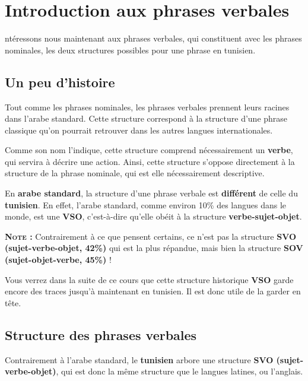 \chapter{Introduction aux phrases verbales}
ntéressons nous maintenant aux phrases verbales, qui constituent avec les phrases nominales, les deux structures possibles pour une phrase en tunisien.

\section{Un peu d'histoire}
Tout comme les phrases nominales, les phrases verbales prennent leurs racines dans l'arabe standard. Cette structure correspond à la structure d'une phrase classique qu'on pourrait retrouver dans les autres langues internationales.

Comme son nom l'indique, cette structure comprend nécessairement un \textbf{verbe}, qui servira à décrire une action. Ainsi, cette structure s'oppose directement à la structure de la phrase nominale, qui est elle nécessairement descriptive.

En \textbf{arabe standard}, la structure d'une phrase verbale est \textbf{différent} de celle du \textbf{tunisien}. En effet, l'arabe standard, comme environ 10\% des langues dans le monde, est une \textbf{VSO}, c'est-à-dire qu'elle obéit à la structure \textbf{verbe-sujet-objet}.

\textbf{\textsc{Note} :} Contrairement à ce que pensent certains, ce n'est pas la structure \textbf{SVO (sujet-verbe-objet, 42\%)} qui est la plus répandue, mais bien la structure \textbf{SOV (sujet-objet-verbe, 45\%)} !

Vous verrez dans la suite de ce cours que cette structure historique \textbf{VSO} garde encore des traces jusqu'à maintenant en tunisien. Il est donc utile de la garder en tête.

\section{Structure des phrases verbales}
Contrairement à l'arabe standard, le \textbf{tunisien} arbore une structure \textbf{SVO (sujet-verbe-objet)}, qui est donc la même structure que le langues latines, ou l'anglais.

